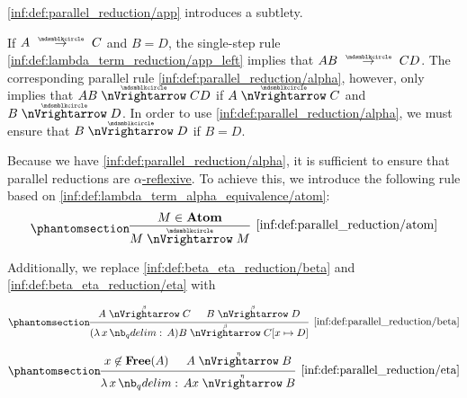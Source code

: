 \begin{definition}
\begin{thmenum}
     \ref{inf:def:parallel_reduction/app} introduces a subtlety.

    If \( A \pred C \) and \( B = D \), the single-step rule \ref{inf:def:lambda_term_reduction/app_left} implies that \( AB \pred CD \). The corresponding parallel rule \ref{inf:def:parallel_reduction/alpha}, however, only implies that \( AB \ppred CD \) if \( A \ppred C \) and \( B \ppred D \). In order to use \ref{inf:def:parallel_reduction/alpha}, we must ensure that \( B \ppred D \) if \( B = D \).

    Because we have \ref{inf:def:parallel_reduction/alpha}, it is sufficient to ensure that parallel reductions are \hyperref[def:alpha_reflexive]{\( \alpha \)-reflexive}. To achieve this, we introduce the following rule based on \ref{inf:def:lambda_term_alpha_equivalence/atom}:
    \begin{equation*}\taglabel[\ensuremath{ \logic{ParAtom}_{\Anon} }]{inf:def:parallel_reduction/atom}
      \begin{prooftree}
        \hypo{ M \in \op*{Atom} }
        \infer1[\ref{inf:def:parallel_reduction/atom}]{ M \ppred M }
      \end{prooftree}
    \end{equation*}
  \end{thmenum}

   Additionally, we replace \ref{inf:def:beta_eta_reduction/beta} and \ref{inf:def:beta_eta_reduction/eta} with
  \begin{paracol}{2}
    \begin{leftcolumn}
      \begin{equation*}\taglabel[\ensuremath{ \logic{ParRed}_\beta }]{inf:def:parallel_reduction/beta}
        \begin{prooftree}
          \hypo{ A \pbred C }
          \hypo{ B \pbred D }
          \infer2[\ref{inf:def:parallel_reduction/beta}]{ (\qabs x A) B \pbred C[x \mapsto D] }.
        \end{prooftree}
      \end{equation*}
    \end{leftcolumn}

    \begin{rightcolumn}
      \begin{equation*}\taglabel[\ensuremath{ \logic{ParRed}_\eta }]{inf:def:parallel_reduction/eta}
        \begin{prooftree}
          \hypo{ x \not\in \op*{Free}(A) }
          \hypo{ A \pered B }
          \infer2[\ref{inf:def:parallel_reduction/eta}]{ \qabs x A x \pered B }.
        \end{prooftree}
      \end{equation*}
    \end{rightcolumn}
  \end{paracol}


\end{definition}
